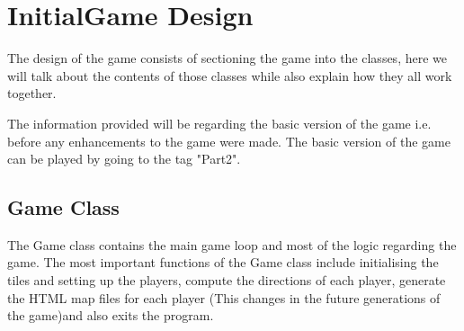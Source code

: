 \documentclass[a4paper,12pt]{extarticle}
\begin{document}
\section{InitialGame Design}
The design of the game consists of sectioning the game into the classes, here we will talk about the contents of those classes while also explain how they all work together.

The information provided will be regarding the basic version of the game i.e. before any enhancements to the game were made. The basic version of the game can be played by going to the tag "Part2".

\subsection{Game Class}
The Game class contains the main game loop and most of the logic regarding the game. The most important functions of the Game class include initialising the tiles and setting up the players, compute the directions of each player, generate the HTML map files for each player (This changes in the future generations of the game)and also exits the program.
\end{document}
